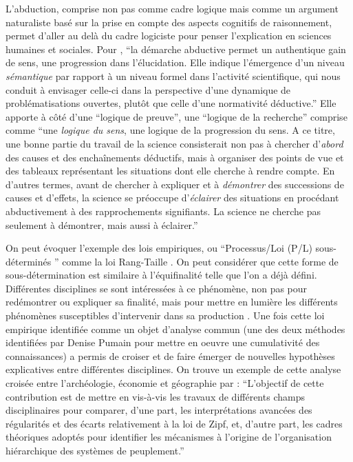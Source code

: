 L'abduction, comprise non pas comme cadre logique mais comme un argument naturaliste basé sur la prise en compte des aspects cognitifs de raisonnement, permet d'aller au delà du cadre logiciste pour penser l'explication en sciences humaines et sociales. Pour \textcite{Besse2000}, \enquote{la démarche abductive permet un authentique gain de sens, une progression dans l'élucidation. Elle indique l'émergence d'un niveau \textit{sémantique} par rapport à un niveau formel dans l'activité scientifique, qui nous conduit à envisager celle-ci dans la perspective d'une dynamique de problématisations ouvertes, plutôt que celle d'une normativité déductive.} Elle apporte à côté d'une \enquote{logique de preuve}, une \enquote{logique de la recherche} comprise comme \enquote{une \textit{logique du sens}, une logique de la progression du sens. A ce titre, une bonne partie du travail de la science consisterait non pas à chercher d'\textit{abord} des causes et des enchaînements déductifs, mais à organiser des points de vue et des tableaux représentant les situations dont elle cherche à rendre compte. En d'autres termes, avant de chercher à expliquer et à \textit{démontrer} des successions de causes et d'effets, la science se préoccupe d'\textit{éclairer} des situations en procédant abductivement à des rapprochements signifiants. La science ne cherche pas seulement à démontrer, mais aussi à éclairer.} 

On peut évoquer l'exemple des lois empiriques, ou \enquote{Processus/Loi (P/L) sous-déterminés } comme la loi Rang-Taille \autocite{Varenne2014}. On peut considérer que cette forme de sous-détermination est similaire à l'équifinalité telle que l'on a déjà défini. Différentes disciplines se sont intéressées à ce phénomène, non pas pour redémontrer ou expliquer sa finalité, mais pour mettre en lumière les différents phénomènes susceptibles d'intervenir dans sa production . Une fois cette loi empirique identifiée comme un objet d'analyse commun (une des deux méthodes identifiées par Denise Pumain pour mettre en oeuvre une cumulativité des connaissances) a permis de croiser et de faire émerger de nouvelles hypothèses explicatives entre différentes disciplines. On trouve un exemple de cette analyse croisée entre l'archéologie, économie et géographie par \textcite{Sanders2012} : \enquote{L’objectif de cette contribution est de mettre en vis-à-vis les travaux de différents champs disciplinaires pour comparer, d’une part, les interprétations avancées des régularités et des écarts relativement à la loi de Zipf, et, d’autre part, les cadres théoriques adoptés pour identifier les mécanismes à l’origine de l’organisation hiérarchique des systèmes de peuplement.}

